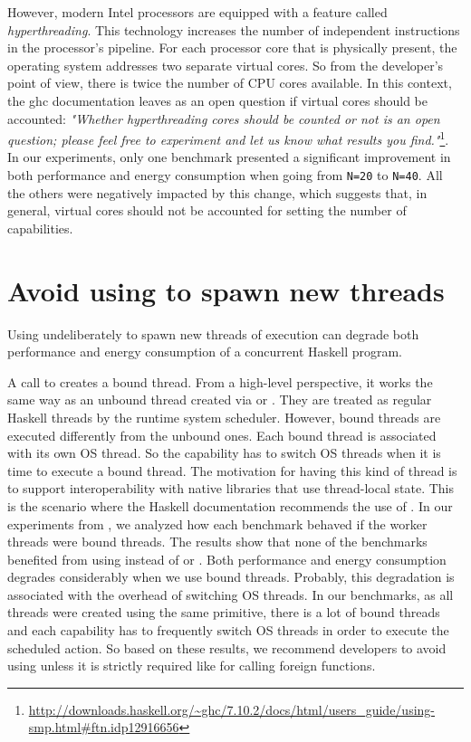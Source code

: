However, modern Intel processors are equipped with a feature called \emph{hyperthreading}. This technology increases the number of independent instructions in the processor's pipeline. For each processor core that is physically present, the operating system addresses two separate virtual cores. So from the developer's point of view, there is twice the number of CPU cores available. In this context, the \ac{ghc} documentation leaves as an open question if virtual cores should be accounted: \emph{"Whether hyperthreading cores should be counted or not is an open question; please feel free to experiment and let us know what results you find."}\footnote{\url{http://downloads.haskell.org/~ghc/7.10.2/docs/html/users\_guide/using-smp.html\#ftn.idp12916656}}. In our experiments, only one benchmark presented a significant improvement in both performance and energy consumption when going from \texttt{N=20} to \texttt{N=40}. All the others were negatively impacted by this change, which suggests that, in general, virtual cores should not be accounted for setting the number of capabilities.


\section{Avoid using \forkOS to spawn new threads}
 Using \forkOS undeliberately to spawn new threads of execution can degrade both performance and energy consumption of a concurrent Haskell program.
\newline

 A call to \forkOS creates a bound thread. From a high-level perspective, it works the same way as an unbound thread created via \forkIO or \forkOn. They are treated as regular Haskell threads by the runtime system scheduler. However, bound threads are executed differently from the unbound ones. Each bound thread is associated with its own OS thread. So the capability has to switch OS threads when it is time to execute a bound thread. The motivation for having this kind of thread is to support interoperability with native libraries that use thread-local state. This is the scenario where the Haskell documentation recommends the use of \forkOS. In our experiments from , we analyzed how each benchmark behaved if the worker threads were bound threads. The results show that none of the benchmarks benefited from using \forkOS instead of \forkIO or \forkOn. Both performance and energy consumption degrades considerably when we use bound threads. Probably, this degradation is associated with the overhead of switching OS threads. In our benchmarks, as all threads were created using the same primitive, there is a lot of bound threads and each capability has to frequently switch OS threads in order to execute the scheduled action. So based on these results, we recommend developers to avoid using \forkOS unless it is strictly required like for calling foreign functions.
